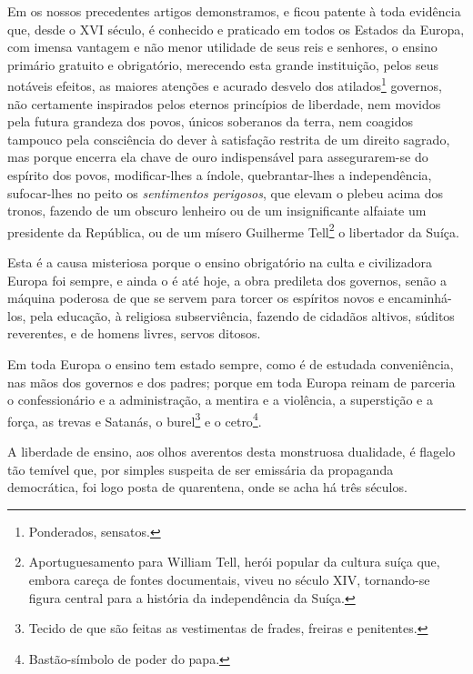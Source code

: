 \asterisc{}

Em os nossos precedentes artigos demonstramos, e ficou patente à toda
evidência que, desde o XVI século, é conhecido e praticado em todos os
Estados da Europa, com imensa vantagem e não menor utilidade de seus
reis e senhores, o ensino primário gratuito e obrigatório, merecendo
esta grande instituição, pelos seus notáveis efeitos, as maiores
atenções e acurado desvelo dos atilados\footnote{Ponderados, sensatos.}
governos, não certamente inspirados pelos eternos princípios de
liberdade, nem movidos pela futura grandeza dos povos, únicos soberanos
da terra, nem coagidos tampouco pela consciência do dever à satisfação
restrita de um direito sagrado, mas porque encerra ela chave de ouro
indispensável para assegurarem-se do espírito dos povos, modificar-lhes
a índole, quebrantar-lhes a independência, sufocar-lhes no peito os
\emph{sentimentos perigosos}, que elevam o plebeu acima dos tronos,
fazendo de um obscuro lenheiro ou de um insignificante alfaiate um
presidente da República, ou de um mísero Guilherme Tell\footnote{
  Aportuguesamento para William Tell, herói popular da cultura suíça
  que, embora careça de fontes documentais, viveu no século XIV,
  tornando-se figura central para a história da independência da Suíça.}
o libertador da Suíça.

Esta é a causa misteriosa porque o ensino obrigatório na culta e
civilizadora Europa foi sempre, e ainda o é até hoje, a obra predileta
dos governos, senão a máquina poderosa de que se servem para torcer os
espíritos novos e encaminhá-los, pela educação, à religiosa
subserviência, fazendo de cidadãos altivos, súditos reverentes, e de
homens livres, servos ditosos.

Em toda Europa o ensino tem estado sempre, como é de estudada
conveniência, nas mãos dos governos e dos padres; porque em toda Europa
reinam de parceria o confessionário e a administração, a mentira e a
violência, a superstição e a força, as trevas e Satanás, o
burel\footnote{Tecido de que são feitas as vestimentas de frades,
  freiras e penitentes.} e o cetro\footnote{Bastão-símbolo de poder do
  papa.}.

A liberdade de ensino, aos olhos averentos desta monstruosa dualidade, é
flagelo tão temível que, por simples suspeita de ser emissária da
propaganda democrática, foi logo posta de quarentena, onde se acha há
três séculos.

